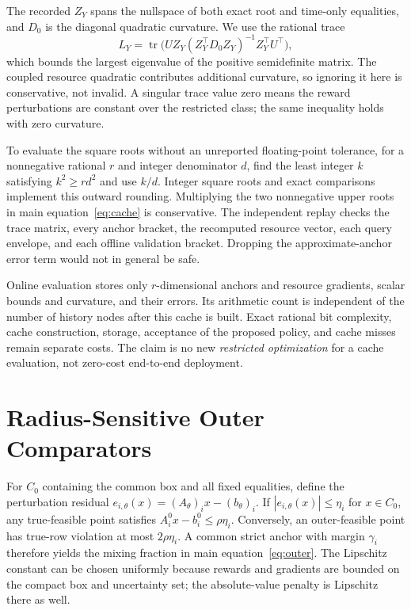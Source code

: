 \documentclass[11pt,letterpaper]{article}
\theoremstyle{definition}\newtheorem{remark}[theorem]{Remark}
\begin{document}
The recorded $Z_Y$ spans the nullspace of both exact root and time-only equalities, and $D_0$ is the diagonal quadratic curvature. We use the rational trace
\[
 L_Y=\operatorname{tr}\bigl(UZ_Y(Z_Y^\top D_0Z_Y)^{-1}Z_Y^\top U^\top\bigr),
\]
which bounds the largest eigenvalue of the positive semidefinite matrix. The coupled resource quadratic contributes additional curvature, so ignoring it here is conservative, not invalid. A singular trace value zero means the reward perturbations are constant over the restricted class; the same inequality holds with zero curvature.

To evaluate the square roots without an unreported floating-point tolerance, for a nonnegative rational $r$ and integer denominator $d$, find the least integer $k$ satisfying $k^2\geq r d^2$ and use $k/d$. Integer square roots and exact comparisons implement this outward rounding. Multiplying the two nonnegative upper roots in main equation~\eqref{eq:cache} is conservative. The independent replay checks the trace matrix, every anchor bracket, the recomputed resource vector, each query envelope, and each offline validation bracket. Dropping the approximate-anchor error term would not in general be safe.

Online evaluation stores only $r$-dimensional anchors and resource gradients, scalar bounds and curvature, and their errors. Its arithmetic count is independent of the number of history nodes after this cache is built. Exact rational bit complexity, cache construction, storage, acceptance of the proposed policy, and cache misses remain separate costs. The claim is no new \emph{restricted optimization} for a cache evaluation, not zero-cost end-to-end deployment.

\section{Radius-Sensitive Outer Comparators}\label{ec:outer}
For $C_0$ containing the common box and all fixed equalities, define the perturbation residual
$e_{i,\theta}(x)=(A_\theta)_i x-(b_\theta)_i$.
If $|e_{i,\theta}(x)|\leq\eta_i$ for $x\in C_0$, any true-feasible point satisfies $A_i^0x-b_i^0\leq\rho\eta_i$. Conversely, an outer-feasible point has true-row violation at most $2\rho\eta_i$. A common strict anchor with margin $\gamma_i$ therefore yields the mixing fraction in main equation~\eqref{eq:outer}. The Lipschitz constant can be chosen uniformly because rewards and gradients are bounded on the compact box and uncertainty set; the absolute-value penalty is Lipschitz there as well.
\end{document}
